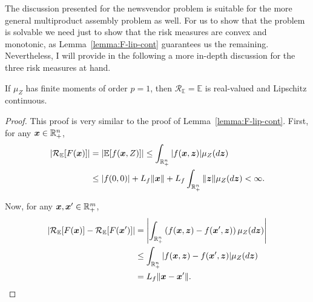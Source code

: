 \documentclass[12pt]{article}
\begin{document}
The discussion presented for the newsvendor problem is suitable for the more general multiproduct assembly problem as well.
For us to show that the problem is solvable we need just to show that the risk measures are convex and monotonic, as Lemma~\ref{lemma:F-lip-cont} guarantees us the remaining.
Nevertheless, I will provide in the following a more in-depth discussion for the three risk measures at hand.


\begin{lemma}\label{lemma:lip-cont-E}
    If $\mu_Z$ has finite moments of order $p=1$, then $\mathcal{R}_{\mathbb{E}} = \mathbb{E}$ is real-valued and Lipschitz continuous.
\end{lemma}
\begin{proof}
    This proof is very similar to the proof of Lemma~\ref{lemma:F-lip-cont}.
    First, for any $\bm{x}\in \mathbb{R}^{n}_+$,
    \begin{align*}
	|\mathcal{R}_{\mathbb{E}}[F(\bm{x})]| &= |\mathbb{E}[f(\bm{x},Z)]| \le \int_{\mathbb{R}^{n}_+} |f(\bm{x},\bm{z})| \mu_Z(d\bm{z}) \\
	&\le |f(0,0)| + L_f \| \bm{x} \| + L_f \int_{\mathbb{R}^{n}_+} \|\bm{z}\| \mu_Z(d\bm{z}) < \infty
    .\end{align*}

    Now, for any $\bm{x},\bm{x}'\in \mathbb{R}^{m}_+$,
    \begin{align*}
	|\mathcal{R}_\mathbb{E}[F(\bm{x})] - \mathcal{R}_\mathbb{E}[F(\bm{x}')]| &= \left| \int_{\mathbb{R}^{n}_+} \left( f(\bm{x},\bm{z}) - f(\bm{x}',\bm{z}) \right) \mu_Z(d\bm{z}) \right|  \\
	&\le \int_{\mathbb{R}^{n}_+} |f(\bm{x},\bm{z}) - f(\bm{x}',\bm{z})| \mu_Z(d\bm{z}) \\
	&= L_f \|\bm{x} - \bm{x}'\|
    .\end{align*}
\end{proof}
\end{document}
